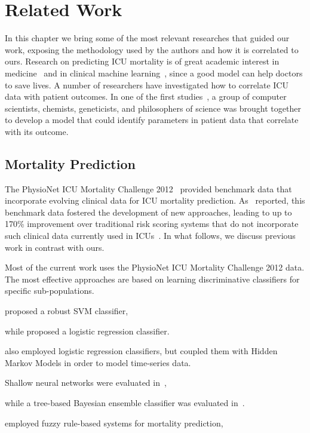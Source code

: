 \chapter{Related Work}
\label{chap:related_work}

In this chapter we bring some of the most relevant researches that guided our work, exposing the methodology used by the authors and how it is correlated to ours. Research on predicting ICU mortality is of great academic interest in medicine~\citep{cai,sun,wu} and in clinical machine learning~\citep{szolovits,decision,luo,nori}, since a good model can help doctors to save lives. A number of researchers have investigated how to correlate ICU data with patient outcomes. In one of the first studies~\citep{ai}, a group of computer scientists, chemists, geneticists, and philosophers of science was brought together to develop a model that could identify parameters in patient data that correlate with its outcome.

\section{Mortality Prediction}

The PhysioNet ICU Mortality Challenge 2012~\citep{silva} provided benchmark data that incorporate evolving clinical data for ICU mortality prediction. As~\citet{revisited} reported, this benchmark data fostered the development of new approaches, leading to up to 170\% improvement over traditional risk scoring systems that do not incorporate such clinical data currently used in ICUs~\citep{saps}. In what follows, we discuss previous work in contrast with ours.

Most of the current work uses the PhysioNet ICU Mortality Challenge 2012 data. The most effective approaches are based on learning discriminative classifiers for specific sub-populations. 

\citet{physionet} proposed a robust SVM classifier, 

while \citet{bera,hamilton} proposed a logistic regression classifier. 

\citet{vairavan} also employed logistic regression classifiers, but coupled them with Hidden Markov Models in order to model time-series data. 

Shallow neural networks were evaluated in~\citep{xia}, 

while a tree-based Bayesian ensemble classifier was evaluated in~\citep{bayes}. 

\citet{krajnak} employed fuzzy rule-based systems for mortality prediction, 


